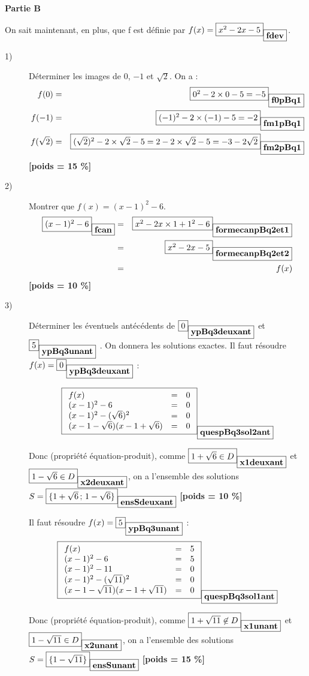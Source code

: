 \documentclass[10pt,a4paper]{article}
\newcommand{\poids}[1]{ {\bf [poids = #1 \%]}}
\newcommand{\var}[2]{\fbox{$#2$}_{\fbox{\mbox{\bf #1}}}}
\begin{document}
\bigskip
\centerline{\bf Partie B}
\bigskip
On sait maintenant, en plus, que f est définie par $f(x) =\var{fdev}{ x^2-2 x -5}$.
\begin{description}
\item[1)] 
Déterminer les images de $0$, $-1$ et $\sqrt{2}$.
On a : 
\begin{eqnarray*}
 f(0) &=&\var{f0pBq1}{ 0^2 - 2 \times 0 -5 = -5 }\\
  f(-1) &=& \var{fm1pBq1}{(-1)^2 - 2 \times (-1) -5 = -2}\\
    f(\sqrt{2}) &=&\var{fm2pBq1}{ (\sqrt{2})^2 - 2 \times \sqrt{2} -5 = 2 - 2 \times \sqrt{2} -5 =  -3 - 2  \sqrt{2}  }
\end{eqnarray*}
\poids{15} %
\item[2)] 
Montrer que $f(x) = (x-1)^2 -6 $. 
\begin{eqnarray*}
 \var{fcan}{(x-1)^2 -6}  &=& \var{formecanpBq2et1}{x^2 - 2 x\times 1 + 1^2 - 6} \\
  &=& \var{formecanpBq2et2}{x^2 - 2 x -5 }\\
  &=& f(x) 
\end{eqnarray*}
\poids{10} %

\item[3)] 
Déterminer les éventuels antécédents de $\var{ypBq3deuxant}{0}$ et $\var{ypBq3unant}{5}$ . On donnera les solutions exactes. 
Il faut résoudre $f(x)=\var{ypBq3deuxant}{0}$ : 

$$
\var{quespBq3sol2ant}{
\begin{array}{lll}
 f(x) &=& 0 \\
 (x-1)^2 -6  &=&0 \\
 (x-1)^2 -(\sqrt{6})^2  &=&0 \\
 (x-1-\sqrt{6})  (x-1+\sqrt{6}) &=&0 \\
\end{array}
}
$$


Donc (propriété équation-produit), comme $\var{x1deuxant}{1+\sqrt{6}\in D}$ 
et $\var{x2deuxant}{1-\sqrt{6}\in D}$, on a l'ensemble des solutions 
$ S =\var{ensSdeuxant}{\{1+\sqrt{6} \,;\,1-\sqrt{6} \}} $\poids{10} %

Il faut résoudre $f(x)=\var{ypBq3unant}{5}$ : 
$$
\var{quespBq3sol1ant}{
\begin{array}{lll}
 f(x) &=&5 \\
 (x-1)^2 -6  &=&5 \\
  (x-1)^2 -11  &=&0 \\
 (x-1)^2 -(\sqrt{11})^2  &=&0 \\
 (x-1-\sqrt{11})  (x-1+\sqrt{11}) &=&0 
\end{array}
}
$$

Donc (propriété équation-produit), comme $\var{x1unant}{1+\sqrt{11}\not\in D}$ 
et $\var{x2unant}{1-\sqrt{11}\in D}$, on a l'ensemble des solutions 
$ S =\var{ensSunant}{ \{1-\sqrt{11} \}}$\poids{15} %
\end{description}
\end{document}
